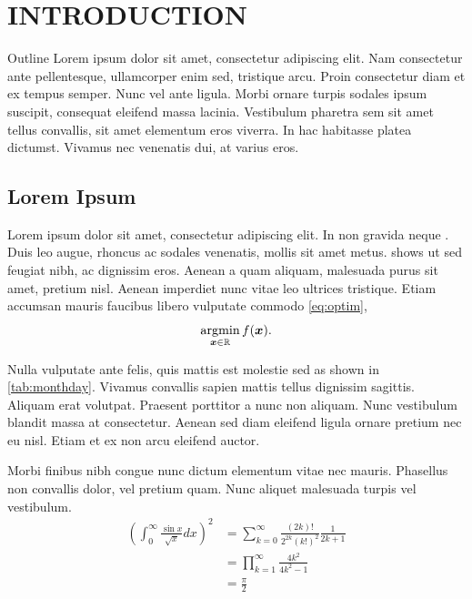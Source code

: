 \chapter{INTRODUCTION}\label{ch:introduction}
\thispagestyle{empty}  %

\begin{outline}{Outline}
  Lorem ipsum dolor sit amet, consectetur adipiscing elit.
  Nam consectetur ante pellentesque, ullamcorper enim sed, tristique arcu.
  Proin consectetur diam et ex tempus semper. Nunc vel ante ligula.
  Morbi ornare turpis sodales ipsum suscipit, consequat eleifend massa lacinia.
  Vestibulum pharetra sem sit amet tellus convallis,
  sit amet elementum eros viverra.
  In hac habitasse platea dictumst.
  Vivamus nec venenatis dui, at varius eros.
\end{outline}

\section{Lorem Ipsum}\label{sec:lorem}

Lorem ipsum \etal \cite{doe2022dummy} dolor sit amet, consectetur adipiscing elit.
In non gravida neque \cite{doe2022dummy,einstein1905zur}.
Duis leo augue, rhoncus ac sodales venenatis, mollis sit amet metus.
 shows ut sed feugiat nibh, ac dignissim eros.
Aenean a quam aliquam, malesuada purus sit amet, pretium nisl.
Aenean imperdiet nunc vitae leo ultrices tristique.
Etiam accumsan mauris faucibus libero vulputate commodo \cref{eq:optim},
\begin{equation}\label{eq:optim}
  \argmin_{\bm{x} \in \mathbb{R}} f(\bm{x}).
\end{equation}

Nulla vulputate ante felis, quis mattis est molestie sed as shown in \cref{tab:monthday}.
Vivamus convallis sapien mattis tellus dignissim sagittis.
Aliquam erat volutpat. Praesent porttitor a nunc non aliquam.
Nunc vestibulum blandit massa at consectetur.
Aenean sed diam eleifend ligula ornare pretium nec eu nisl.
Etiam et ex non arcu eleifend auctor.

Morbi finibus nibh congue nunc dictum elementum vitae nec mauris.
Phasellus non convallis dolor, vel pretium quam.
Nunc aliquet malesuada turpis vel vestibulum.
\begin{equation}\label{eq:sample}
  \begin{split}
  \left( \int_0^\infty \frac{\sin x}{\sqrt{x}} dx \right)^2
  &= \sum_{k=0}^\infty \frac{(2k)!}{2^{2k}(k!)^2} \frac{1}{2k+1} \\
  &= \prod_{k=1}^\infty \frac{4k^2}{4k^2 - 1} \\
  &= \frac{\pi}{2}
  \end{split}
\end{equation}

